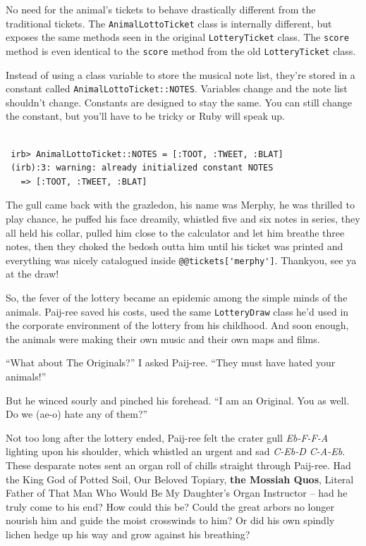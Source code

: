 \documentclass[10pt,twoside]{report}
\begin{document}
No need for the animal's tickets to behave drastically different from
the traditional tickets.  The
\lstinline[breaklines=true]|AnimalLottoTicket| class is internally
different, but exposes the same methods seen in the original
\lstinline[breaklines=true]|LotteryTicket| class. The
\lstinline[breaklines=true]|score| method is even identical to the
\lstinline[breaklines=true]|score| method from the old
\lstinline[breaklines=true]|LotteryTicket| class.

Instead of using a class variable to store the musical note list,
they're stored in a constant called
\lstinline[breaklines=true]|AnimalLottoTicket::NOTES|.  Variables
change and the note list shouldn't change.  Constants are designed to
stay the same.  You can still change the constant, but you'll have to
be tricky or Ruby will speak up.


\begin{lstlisting}

 irb> AnimalLottoTicket::NOTES = [:TOOT, :TWEET, :BLAT]
 (irb):3: warning: already initialized constant NOTES
   => [:TOOT, :TWEET, :BLAT]

\end{lstlisting}


The gull came back with the grazledon, his name was Merphy, he was
thrilled to play chance, he puffed his face dreamily, whistled five
and six notes in series, they all held his collar, pulled him close to
the calculator and let him breathe three notes, then they choked the
bedosh outta him until his ticket was printed and everything was
nicely catalogued inside
\lstinline[breaklines=true]|@@tickets['merphy']|.  Thankyou, see ya at
the draw!

So, the fever of the lottery became an epidemic among the simple minds
of the animals.  Paij-ree saved his costs, used the same
\lstinline[breaklines=true]|LotteryDraw| class he'd used in the
corporate environment of the lottery from his childhood.  And soon
enough, the animals were making their own music and their own maps and
films.

``What about The Originals?'' I asked Paij-ree.  ``They must have
hated your animals!''

But he winced sourly and pinched his forehead.  ``I am an Original.
You as well. Do we (ae-o) hate any of them?''

Not too long after the lottery ended, Paij-ree felt the crater gull
{\em Eb-F-F-A} lighting upon his shoulder, which whistled an urgent
and sad {\em C-Eb-D C-A-Eb}. These desparate notes sent an organ roll
of chills straight through Paij-ree.  Had the King God of Potted Soil,
Our Beloved Topiary, {\bf the Mossiah Quos}, Literal Father of That
Man Who Would Be My Daughter's Organ Instructor -- had he truly come
to his end? How could this be?  Could the great arbors no longer
nourish him and guide the moist crosswinds to him?  Or did his own
spindly lichen hedge up his way and grow against his breathing?
\end{document}
